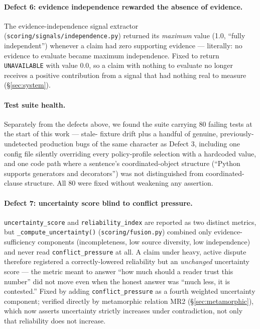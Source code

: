 \paragraph{Defect 6: evidence independence rewarded the absence of
evidence.} The evidence-independence signal extractor
(\texttt{scoring/signals/independence.py}) returned its \emph{maximum}
value (1.0, ``fully independent'') whenever a claim had zero supporting
evidence --- literally: no evidence to evaluate became maximum independence.
Fixed to return \texttt{UNAVAILABLE} with value 0.0, so a claim with
nothing to evaluate no longer receives a positive contribution from a
signal that had nothing real to measure (\S\ref{sec:system}).

\paragraph{Test suite health.} Separately from the defects above, we found
the suite carrying 80 failing tests at the start of this work --- stale-
fixture drift plus a handful of genuine, previously-undetected production
bugs of the same character as Defect 3, including one config file
silently overriding every policy-profile selection with a hardcoded value,
and one code path where a sentence's coordinated-object structure
(``Python supports generators and decorators'') was not distinguished
from coordinated-clause structure. All 80 were fixed without weakening any
assertion.

\paragraph{Defect 7: uncertainty score blind to conflict pressure.}
\texttt{uncertainty\_score} and \texttt{reliability\_index} are reported as
two distinct metrics, but \texttt{\_compute\_uncertainty()}
(\texttt{scoring/fusion.py}) combined only evidence-sufficiency components
(incompleteness, low source diversity, low independence) and never read
\texttt{conflict\_pressure} at all. A claim under heavy, active dispute
therefore registered a correctly-lowered reliability but an
\emph{unchanged} uncertainty score --- the metric meant to answer ``how
much should a reader trust this number'' did not move even when the honest
answer was ``much less, it is contested.'' Fixed by adding
\texttt{conflict\_pressure} as a fourth weighted uncertainty component;
verified directly by metamorphic relation MR2 (\S\ref{sec:metamorphic}),
which now asserts uncertainty strictly increases under contradiction, not
only that reliability does not increase.

